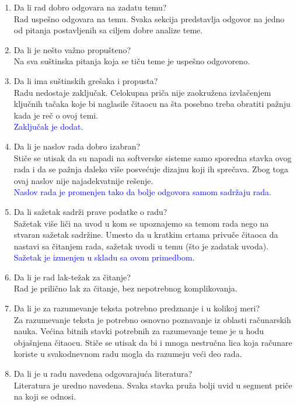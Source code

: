 \documentclass[a4paper]{report}
\newcommand{\odgovor}[1]{\textcolor{blue}{#1}}
\begin{document}
\begin{enumerate}
\item Da li rad dobro odgovara na zadatu temu?\\
{Rad uspešno odgovara na temu. Svaka sekcija predstavlja odgovor na jedno od pitanja postavljenih sa ciljem dobre analize teme.}
\item Da li je nešto važno propušteno?\\
{Na sva suštinska pitanja koja se tiču teme je uspešno odgovoreno.}
\item Da li ima suštinskih grešaka i propusta?\\
{Radu nedostaje zaključak. Celokupna priča nije zaokružena izvlačenjem ključnih tačaka koje bi naglasile čitaocu na šta posebno treba obratiti pažnju kada je reč o ovoj temi.}\\
\odgovor{Zaključak je dodat.}
\item Da li je naslov rada dobro izabran?\\
{Stiče se utisak da su napadi na softverske sisteme samo sporedna stavka ovog rada i da se pažnja daleko više posvećuje dizajnu koji ih sprečava. Zbog toga ovaj naslov nije najadekvatnije rešenje.}\\
\odgovor{Naslov rada je promenjen tako da bolje odgovora samom sadržaju rada.}
\item Da li sažetak sadrži prave podatke o radu?\\
{Sažetak više liči na uvod u kom se upoznajemo sa temom rada nego na stvaran sažetak sadržine. Umesto da u kratkim crtama privuče čitaoca da nastavi sa čitanjem rada, sažetak uvodi u temu (što je zadatak uvoda).}\\
\odgovor{Sažetak je izmenjen u skladu sa ovom primedbom.}
\item Da li je rad lak-težak za čitanje?\\
{Rad je prilično lak za čitanje, bez nepotrebnog komplikovanja.}
\item Da li je za razumevanje teksta potrebno predznanje i u kolikoj meri?\\
{Za razumevanje teksta je potrebno osnovno poznavanje iz oblasti računarskih nauka. Većina bitnih stavki potrebnih za razumevanje teme je u hodu objašnjena čitaocu. Stiče se utisak da bi i mnoga nestručna lica koja računare koriste u svakodnevnom radu mogla da razumeju veći deo rada.}
\item Da li je u radu navedena odgovarajuća literatura?\\
{Literatura je uredno navedena. Svaka stavka pruža bolji uvid u segment priče na koji se odnosi.}

\end{enumerate}
\end{document}
